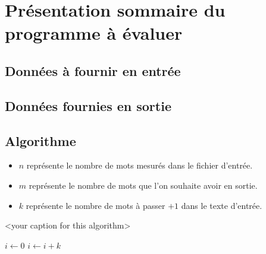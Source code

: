 
\section{Présentation sommaire du programme à évaluer}

\subsection{Données à fournir en entrée}

\subsection{Données fournies en sortie}

\subsection{Algorithme}



\begin{itemize}
	\item $n$ représente le nombre de mots mesurés dans le fichier d'entrée.
	\item $m$ représente le nombre de mots que l'on souhaite avoir en sortie.
	\item $k$ représente le nombre de mots à passer $+ 1$ dans le texte d'entrée.
\end{itemize}



\begin{algorithm}
	\caption{<your caption for this algorithm>}
	\label{<your label for references later in your document>}
	\begin{algorithmic}
		\State $i\gets 0$
		\Else
		\State $i\gets i+k$
		\EndIf
		\EndIf
	\end{algorithmic}
\end{algorithm}
